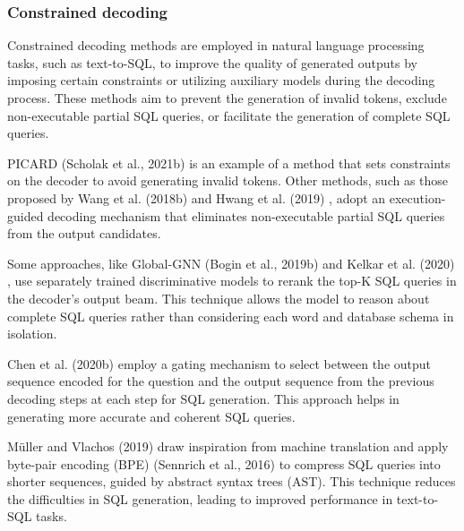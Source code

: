 \subsubsection{Constrained decoding}

Constrained decoding methods are employed in natural language processing tasks, such as text-to-SQL, to improve the quality of generated outputs by imposing certain constraints or utilizing auxiliary models during the decoding process. These methods aim to prevent the generation of invalid tokens, exclude non-executable partial SQL queries, or facilitate the generation of complete SQL queries.

PICARD (Scholak et al., 2021b) \cite{Scholak2021:PICARD} is an example of a method that sets constraints on the decoder to avoid generating invalid tokens. Other methods, such as those proposed by Wang et al. (2018b) \cite{wang2018robust} and Hwang et al. (2019) \cite{DBLP:journals/corr/abs-1902-01069}, adopt an execution-guided decoding mechanism that eliminates non-executable partial SQL queries from the output candidates.

Some approaches, like Global-GNN (Bogin et al., 2019b) \cite{bogin-etal-2019-global} and Kelkar et al. (2020) \cite{kelkar2020bertranddr}, use separately trained discriminative models to rerank the top-K SQL queries in the decoder's output beam. This technique allows the model to reason about complete SQL queries rather than considering each word and database schema in isolation.

Chen et al. (2020b) \cite{chen-etal-2020-tale} employ a gating mechanism to select between the output sequence encoded for the question and the output sequence from the previous decoding steps at each step for SQL generation. This approach helps in generating more accurate and coherent SQL queries.

Müller and Vlachos (2019) \cite{müller2019bytepair} draw inspiration from machine translation and apply byte-pair encoding (BPE) (Sennrich et al., 2016) \cite{sennrich-etal-2016-neural} to compress SQL queries into shorter sequences, guided by abstract syntax trees (AST). This technique reduces the difficulties in SQL generation, leading to improved performance in text-to-SQL tasks.

